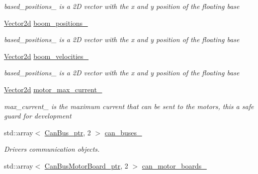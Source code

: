 \begin{DoxyCompactItemize}
\begin{DoxyCompactList}\small\item\em based\+\_\+positions\+\_\+ is a 2D vector with the x and y position of the floating base \end{DoxyCompactList}\item 
\hyperlink{common__header_8hpp_acb6916bc8c9fe9d98c484fd4cc201447}{Vector2d} \hyperlink{classblmc__robots_1_1Stuggihop_ade07babef35f510b27bf1a6aa4a4a7bd}{boom\+\_\+positions\+\_\+}\hypertarget{classblmc__robots_1_1Stuggihop_ade07babef35f510b27bf1a6aa4a4a7bd}{}\label{classblmc__robots_1_1Stuggihop_ade07babef35f510b27bf1a6aa4a4a7bd}

\begin{DoxyCompactList}\small\item\em based\+\_\+positions\+\_\+ is a 2D vector with the x and y position of the floating base \end{DoxyCompactList}\item 
\hyperlink{common__header_8hpp_acb6916bc8c9fe9d98c484fd4cc201447}{Vector2d} \hyperlink{classblmc__robots_1_1Stuggihop_a1ba0991f17e42a011eddac7aa198f476}{boom\+\_\+velocities\+\_\+}\hypertarget{classblmc__robots_1_1Stuggihop_a1ba0991f17e42a011eddac7aa198f476}{}\label{classblmc__robots_1_1Stuggihop_a1ba0991f17e42a011eddac7aa198f476}

\begin{DoxyCompactList}\small\item\em based\+\_\+positions\+\_\+ is a 2D vector with the x and y position of the floating base \end{DoxyCompactList}\item 
\hyperlink{common__header_8hpp_acb6916bc8c9fe9d98c484fd4cc201447}{Vector2d} \hyperlink{classblmc__robots_1_1Stuggihop_a6b42e186971644de0a9fd85c23777c29}{motor\+\_\+max\+\_\+current\+\_\+}\hypertarget{classblmc__robots_1_1Stuggihop_a6b42e186971644de0a9fd85c23777c29}{}\label{classblmc__robots_1_1Stuggihop_a6b42e186971644de0a9fd85c23777c29}

\begin{DoxyCompactList}\small\item\em max\+\_\+current\+\_\+ is the maximum current that can be sent to the motors, this a safe guard for development \end{DoxyCompactList}\item 
std\+::array$<$ \hyperlink{common__header_8hpp_a793c8789a7598e8aaf766939da7262af}{Can\+Bus\+\_\+ptr}, 2 $>$ \hyperlink{classblmc__robots_1_1Stuggihop_a708d4483e73a19b8e98dd33d0c22e2aa}{can\+\_\+buses\+\_\+}
\begin{DoxyCompactList}\small\item\em Drivers communication objects. \end{DoxyCompactList}\item 
std\+::array$<$ \hyperlink{common__header_8hpp_aab1c6ddb1273247a1b45d5e8b417c216}{Can\+Bus\+Motor\+Board\+\_\+ptr}, 2 $>$ \hyperlink{classblmc__robots_1_1Stuggihop_a1d3b7f7f48192e25ec5be139fe6f2ee3}{can\+\_\+motor\+\_\+boards\+\_\+}\hypertarget{classblmc__robots_1_1Stuggihop_a1d3b7f7f48192e25ec5be139fe6f2ee3}{}\label{classblmc__robots_1_1Stuggihop_a1d3b7f7f48192e25ec5be139fe6f2ee3}


\end{DoxyCompactItemize}
